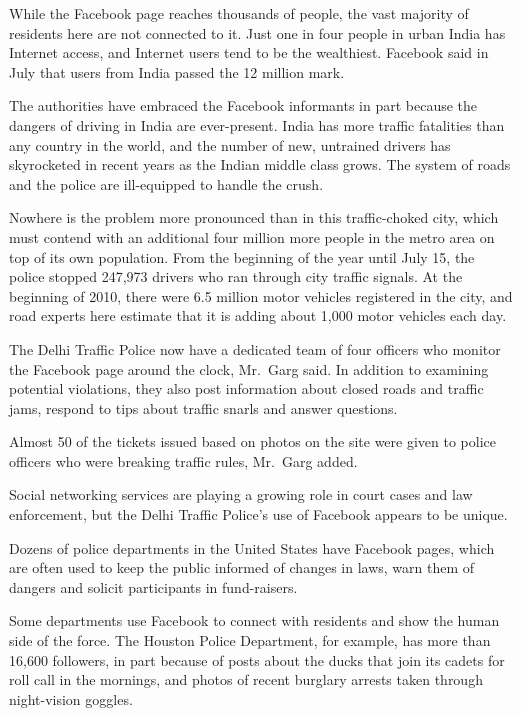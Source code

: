 ﻿\documentclass[12pt]{article}
\begin{document}
While the Facebook page reaches thousands of people, the vast majority of residents here are not
connected to it. Just one in four people in urban India has Internet access, and Internet users tend
to be the wealthiest. Facebook said in July that users from India passed the 12 million mark.

The authorities have embraced the Facebook informants in part because the dangers of driving in
India are ever-present. India has more traffic fatalities than any country in the world, and the
number of new, untrained drivers has skyrocketed in recent years as the Indian middle class grows.
The system of roads and the police are ill-equipped to handle the crush.

Nowhere is the problem more pronounced than in this traffic-choked city, which must contend with an
additional four million more people in the metro area on top of its own population. From the
beginning of the year until July 15, the police stopped 247,973 drivers who ran through city traffic
signals. At the beginning of 2010, there were 6.5 million motor vehicles registered in the city, and
road experts here estimate that it is adding about 1,000 motor vehicles each day.

The Delhi Traffic Police now have a dedicated team of four officers who monitor the Facebook page
around the clock, Mr.~Garg said. In addition to examining potential violations, they also post
information about closed roads and traffic jams, respond to tips about traffic snarls and answer
questions.

Almost 50 of the tickets issued based on photos on the site were given to police officers who were
breaking traffic rules, Mr.~Garg added.

Social networking services are playing a growing role in court cases and law enforcement, but the
Delhi Traffic Police's use of Facebook appears to be unique.

Dozens of police departments in the United States have Facebook pages, which are often used to keep
the public informed of changes in laws, warn them of dangers and solicit participants in
fund-raisers.

Some departments use Facebook to connect with residents and show the human side of the force. The
Houston Police Department, for example, has more than 16,600 followers, in part because of posts
about the ducks that join its cadets for roll call in the mornings, and photos of recent burglary
arrests taken through night-vision goggles.
\end{document}
